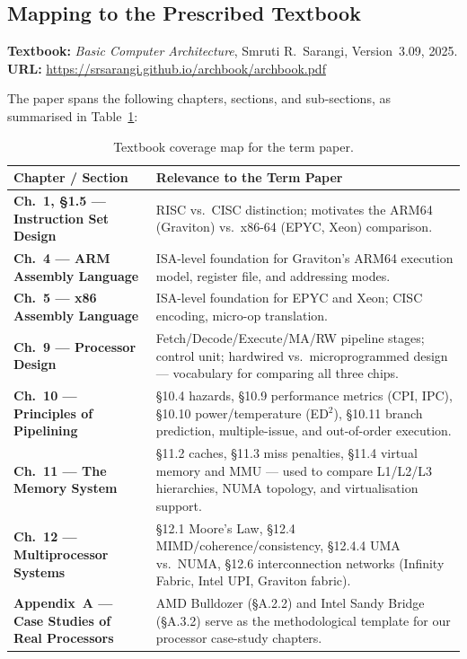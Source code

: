 \documentclass[12pt,a4paper]{article}
\begin{document}
\subsection{Mapping to the Prescribed Textbook}
\textbf{Textbook:} \textit{Basic Computer Architecture}, Smruti R.\ Sarangi,
Version~3.09, 2025.\\
\textbf{URL:} \url{https://srsarangi.github.io/archbook/archbook.pdf}

The paper spans the following chapters, sections, and sub-sections, as
summarised in Table~\ref{tab:textbook-map}:

\begin{table}[h!]
\centering
\small
\renewcommand{\arraystretch}{1.35}
\begin{tabularx}{\linewidth}{>{\bfseries}l X}
\toprule
Chapter / Section & Relevance to the Term Paper \\
\midrule
Ch.\ 1, \S1.5 --- Instruction Set Design &
  RISC\glsadd{risc}\index{RISC} vs.\ CISC\glsadd{cisc}\index{CISC}
  distinction; motivates the ARM64 (Graviton) vs.\
  x86-64 (EPYC, Xeon) comparison. \\
Ch.\ 4 --- ARM Assembly Language &
  ISA-level foundation for Graviton's ARM64 execution model,
  register file, and addressing modes. \\
Ch.\ 5 --- x86 Assembly Language &
  ISA-level foundation for EPYC and Xeon; CISC encoding, micro-op
  translation. \\
Ch.\ 9 --- Processor Design &
  Fetch/Decode/Execute/MA/RW pipeline\glsadd{pipelineterm}\index{pipeline}
  stages; control unit; hardwired vs.\ microprogrammed design ---
  vocabulary for comparing all three chips. \\
Ch.\ 10 --- Principles of Pipelining &
  \S10.4 hazards, \S10.9 performance metrics (CPI, IPC),
  \S10.10 power/temperature (ED$^2$), \S10.11 branch prediction,
  multiple-issue, and out-of-order\glsadd{oooterm} execution. \\
Ch.\ 11 --- The Memory System &
  \S11.2 caches, \S11.3 miss penalties, \S11.4 virtual memory and MMU
  --- used to compare L1/L2/L3 hierarchies, NUMA\glsadd{numa}\index{NUMA}
  topology, and virtualisation support. \\
Ch.\ 12 --- Multiprocessor Systems &
  \S12.1 Moore's Law, \S12.4 MIMD/coherence/consistency\index{cache
  coherence}\glsadd{cachecoherence}, \S12.4.4 UMA vs.\ NUMA, \S12.6
  interconnection networks (Infinity Fabric, Intel UPI\glsadd{upi},
  Graviton fabric). \\
Appendix~A --- Case Studies of Real Processors &
  AMD Bulldozer (\S A.2.2) and Intel Sandy Bridge (\S A.3.2) serve as
  the methodological template for our processor case-study chapters. \\
\bottomrule
\end{tabularx}
\caption{Textbook coverage map for the term paper.}
\label{tab:textbook-map}
\end{table}
\end{document}
